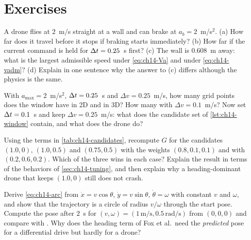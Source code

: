 \section{Exercises}
\label{sec:ch14-exercises}

\begin{exercise}[\difficulty{1}]
\label{exr:ch14-braking}
A drone flies at $2$~m/s straight at a wall and can brake at
$a_b = 2$~m/s$^2$. (a) How far does it travel before it stops if braking
starts immediately? (b) How far if the current command is held for
$\Delta t = 0.25$~s first? (c) The wall is $0.608$~m away: what is the largest
admissible speed under \cref{eq:ch14-Va} and under \cref{eq:ch14-vadm}?
(d) Explain in one sentence why the answer to (c) differs although the
physics is the same.
\end{exercise}

\begin{exercise}[\difficulty{1}]
\label{exr:ch14-window}
With $a_{\max} = 2$~m/s$^2$, $\Delta t = 0.25$~s and $\Delta v = 0.25$~m/s, how
many grid points does the window have in 2D and in 3D? How many with
$\Delta v = 0.1$~m/s? Now set $\Delta t = 0.1$~s and keep $\Delta v = 0.25$~m/s:
what does the candidate set of \cref{lst:ch14-window} contain, and what does
the drone do?
\end{exercise}

\begin{exercise}[\difficulty{2}]
\label{exr:ch14-scores}
Using the terms in \cref{tab:ch14-candidates}, recompute $G$ for the
candidates $(1.0, 0)$, $(1.0, 0.5)$ and $(0.75, 0.5)$ with the weights
$(0.8, 0.1, 0.1)$ and with $(0.2, 0.6, 0.2)$. Which of the three wins in each
case? Explain the result in terms of the behaviors of
\cref{sec:ch14-tuning}, and then explain why a heading-dominant drone that
keeps $(1.0, 0)$ still does not crash.
\end{exercise}

\begin{exercise}[\difficulty{2}]
\label{exr:ch14-arcs}
Derive \cref{eq:ch14-arc} from $\dot x = v\cos\theta$, $\dot y = v\sin\theta$,
$\dot\theta = \omega$ with constant $v$ and $\omega$, and show that the
trajectory is a circle of radius $v/\omega$ through the start pose. Compute
the pose after $2$~s for $(v, \omega) = (1\,\text{m/s}, 0.5\,\text{rad/s})$
from $(0, 0, 0)$ and compare with . Why does the
heading term of Fox et al.\ need the \emph{predicted} pose for a
differential drive but hardly for a drone?
\end{exercise}

